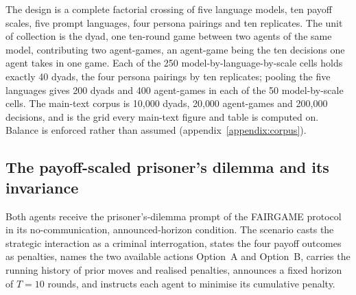 \documentclass[11pt,a4paper]{article}
\begin{document}
The design is a complete factorial crossing of five language models, ten payoff
scales, five prompt languages, four persona pairings and ten replicates. The
unit of collection is the dyad, one ten-round game between two agents of the
same model, contributing two agent-games, an agent-game being the ten decisions
one agent takes in one game. Each of the 250 model-by-language-by-scale cells
holds exactly 40 dyads, the four persona pairings by ten replicates; pooling
the five languages gives 200 dyads and 400 agent-games in each of the 50
model-by-scale cells. The main-text corpus is 10{,}000 dyads, 20{,}000
agent-games and 200{,}000 decisions, and is the grid every main-text figure and
table is computed on. Balance is enforced rather than assumed
(appendix~\ref{appendix:corpus}).

\subsection{The payoff-scaled prisoner's dilemma and its invariance}\label{sec:gameImportance}

Both agents receive the prisoner's-dilemma prompt of the FAIRGAME
protocol~\cite{buscemi2025fairgame} in its no-communication, announced-horizon
condition. The scenario casts the strategic interaction as a criminal
interrogation, states the four payoff outcomes as penalties, names the two
available actions Option~A and Option~B, carries the running history of prior
moves and realised penalties, announces a fixed horizon of $T = 10$ rounds, and
instructs each agent to minimise its cumulative penalty.
\end{document}
